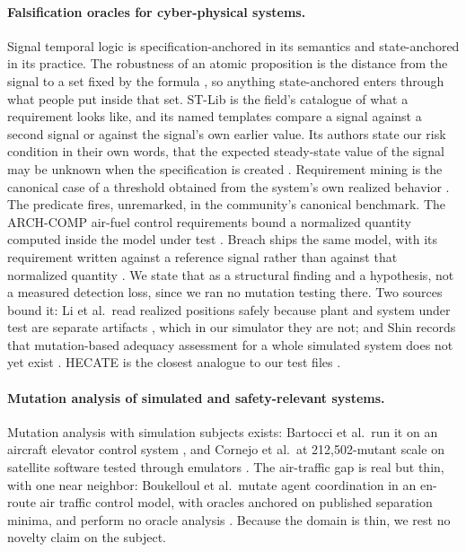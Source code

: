 \documentclass[12pt]{article}
\begin{document}
\paragraph{Falsification oracles for cyber-physical systems.} Signal temporal
logic is specification-anchored in its semantics and state-anchored in its
practice. The robustness of an atomic proposition is the distance from the signal
to a set fixed by the formula \cite{abbas2014}, so anything state-anchored enters
through what people put inside that set. ST-Lib is the field's catalogue of what
a requirement looks like, and its named templates compare a signal against a
second signal or against the signal's own earlier value. Its authors state our
risk condition in their own words, that the expected steady-state value of the
signal may be unknown when the specification is created \cite{kapinski2016}. Requirement mining is the canonical case of a threshold
obtained from the system's own realized behavior \cite{jin2015}. The predicate
fires, unremarked, in the community's canonical benchmark. The ARCH-COMP air-fuel
control requirements bound a normalized quantity computed inside the model under
test \cite{archcomp-artifact,menghi2023}. Breach ships the same model, with its
requirement written against a reference signal rather than against that
normalized quantity \cite{breach-artifact}. We state that as a structural finding and a
hypothesis, not a measured detection loss, since we ran no mutation testing
there. Two sources bound it: Li et al.\ read realized positions safely
because plant and system under test are separate artifacts \cite{li2024}, which
in our simulator they are not; and Shin records that mutation-based adequacy
assessment for a whole simulated system does not yet exist \cite{shin2026}.
HECATE is the closest analogue to our test files \cite{formica2022}.

\paragraph{Mutation analysis of simulated and safety-relevant systems.} Mutation
analysis with simulation subjects exists: Bartocci et al.\ run it on an
aircraft elevator control system \cite{bartocci2023}, and Cornejo et al.\ at
212{,}502-mutant scale on satellite software tested through emulators
\cite{cornejo2022,vigano2022}. The air-traffic gap is real but thin, with one near
neighbor: Boukelloul et al.\ mutate agent coordination in an en-route air
traffic control model, with oracles anchored on published separation minima, and perform
no oracle analysis \cite{boukelloul2025}. Because the domain is thin, we rest no
novelty claim on the subject.
\end{document}
